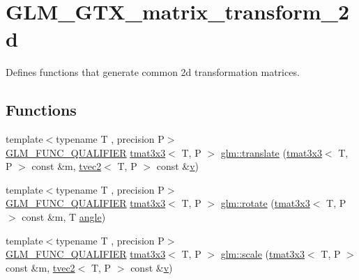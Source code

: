 \hypertarget{group__gtx__matrix__transform__2d}{}\section{G\+L\+M\+\_\+\+G\+T\+X\+\_\+matrix\+\_\+transform\+\_\+2d}
\label{group__gtx__matrix__transform__2d}


Defines functions that generate common 2d transformation matrices.  


\subsection*{Functions}
\begin{DoxyCompactItemize}
\item 
{\footnotesize template$<$typename T , precision P$>$ }\\\mbox{\hyperlink{setup_8hpp_a33fdea6f91c5f834105f7415e2a64407}{G\+L\+M\+\_\+\+F\+U\+N\+C\+\_\+\+Q\+U\+A\+L\+I\+F\+I\+ER}} \mbox{\hyperlink{structglm_1_1tmat3x3}{tmat3x3}}$<$ T, P $>$ \mbox{\hyperlink{group__gtx__matrix__transform__2d_ga3786656ac137084ef73151636eff44d8}{glm\+::translate}} (\mbox{\hyperlink{structglm_1_1tmat3x3}{tmat3x3}}$<$ T, P $>$ const \&m, \mbox{\hyperlink{structglm_1_1tvec2}{tvec2}}$<$ T, P $>$ const \&\mbox{\hyperlink{glad_8h_a14cfbe2fc2234f5504618905b69d1e06}{v}})
\item 
{\footnotesize template$<$typename T , precision P$>$ }\\\mbox{\hyperlink{setup_8hpp_a33fdea6f91c5f834105f7415e2a64407}{G\+L\+M\+\_\+\+F\+U\+N\+C\+\_\+\+Q\+U\+A\+L\+I\+F\+I\+ER}} \mbox{\hyperlink{structglm_1_1tmat3x3}{tmat3x3}}$<$ T, P $>$ \mbox{\hyperlink{group__gtx__matrix__transform__2d_ga23ec870ee4b75d85cc021e0fd1532b48}{glm\+::rotate}} (\mbox{\hyperlink{structglm_1_1tmat3x3}{tmat3x3}}$<$ T, P $>$ const \&m, T \mbox{\hyperlink{group__gtc__quaternion_gad4a4448baedb198b2b1e7880d2544dc9}{angle}})
\item 
{\footnotesize template$<$typename T , precision P$>$ }\\\mbox{\hyperlink{setup_8hpp_a33fdea6f91c5f834105f7415e2a64407}{G\+L\+M\+\_\+\+F\+U\+N\+C\+\_\+\+Q\+U\+A\+L\+I\+F\+I\+ER}} \mbox{\hyperlink{structglm_1_1tmat3x3}{tmat3x3}}$<$ T, P $>$ \mbox{\hyperlink{group__gtx__matrix__transform__2d_gadb9f2a729d399ae5e9c33eb64d0d66fe}{glm\+::scale}} (\mbox{\hyperlink{structglm_1_1tmat3x3}{tmat3x3}}$<$ T, P $>$ const \&m, \mbox{\hyperlink{structglm_1_1tvec2}{tvec2}}$<$ T, P $>$ const \&\mbox{\hyperlink{glad_8h_a14cfbe2fc2234f5504618905b69d1e06}{v}})

\end{DoxyCompactItemize}

